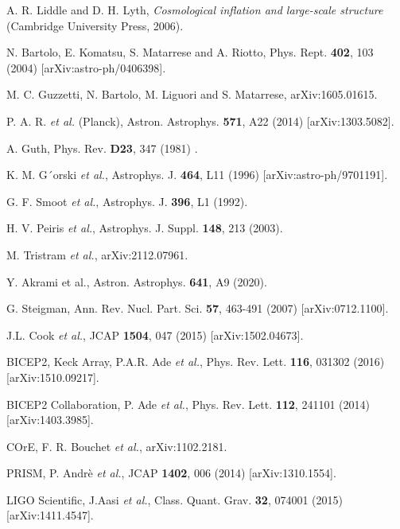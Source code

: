 \documentclass[11pt,a4paper,twoside]{book}
\begin{document}
\begin{thebibliography}{2}
	
	 A. R. Liddle and D. H. Lyth, \emph{Cosmological inflation and large-scale structure} (Cambridge University Press, 2006).
	
	 N. Bartolo, E. Komatsu, S. Matarrese and A. Riotto, Phys. Rept. \textbf{402}, 103 (2004) [arXiv:astro-ph/0406398].
	
	 M. C. Guzzetti, N. Bartolo, M. Liguori and S. Matarrese,  arXiv:1605.01615. 
	
	 P. A. R. \textit{et al.} (Planck), Astron. Astrophys. \textbf{571}, A22 (2014) [arXiv:1303.5082].
	
	 A. Guth, Phys. Rev. \textbf{D23}, 347 (1981) .
	
	 K. M. G´orski \textit{et al.}, Astrophys. J. \textbf{464}, L11 (1996) [arXiv:astro-ph/9701191].
	
	 G. F. Smoot \textit{et al.}, Astrophys. J. \textbf{396}, L1 (1992).

     H. V. Peiris \textit{et al.}, Astrophys. J. Suppl. \textbf{148}, 213 (2003).
    
     M. Tristram \textit{et al.},  arXiv:2112.07961.
	
	 Y. Akrami et al., Astron. Astrophys. \textbf{641}, A9 (2020).
	
	 G. Steigman, Ann. Rev. Nucl. Part. Sci. \textbf{57}, 463-491 (2007) [arXiv:0712.1100].
	
	 J.L. Cook \textit{et al.}, JCAP \textbf{1504}, 047 (2015)  [arXiv:1502.04673].
	
	 BICEP2, Keck Array, P.A.R. Ade \textit{et al.}, Phys. Rev. Lett. \textbf{116}, 031302 (2016) [arXiv:1510.09217].
	
	 BICEP2 Collaboration, P. Ade \textit{et al.}, Phys. Rev. Lett. \textbf{112}, 241101  (2014)  [arXiv:1403.3985].
	
	 COrE, F. R. Bouchet \textit{et al.}, arXiv:1102.2181.  
	
	 PRISM, P. Andrè \textit{et al.}, JCAP \textbf{1402}, 006 (2014) [arXiv:1310.1554].
	
	 LIGO Scientific, J.Aasi \textit{et al.}, Class. Quant. Grav. \textbf{32}, 074001 (2015)  [arXiv:1411.4547].
	

\end{thebibliography}
\end{document}
